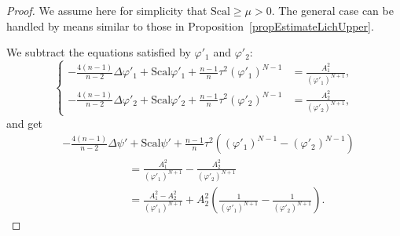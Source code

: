\documentclass[a4paper, 10pt, reqno]{amsart}
\theoremstyle{plain}
\theoremstyle{remark}
\theoremstyle{definition}
\renewcommand{\phi}{\varphi}
\newcommand{\scal}{\mathrm{Scal}}
\begin{document}
\begin{proof}
	We assume here for simplicity that $\scal \geq \mu > 0$. The general case can
	be handled by means similar to those in
	Proposition~\ref{propEstimateLichUpper}.

	We subtract the equations satisfied by $\phi'_1$ and $\phi'_2$:
	\[
		\left\lbrace
		\begin{aligned}
			- \frac{4(n-1)}{n-2} \Delta \phi'_1 + \scal \phi'_1 + \frac{n-1}{n} \tau^2 (\phi'_1)^{N-1} & = \frac{A_1^2}{(\phi'_1)^{N+1}}, \\
			- \frac{4(n-1)}{n-2} \Delta \phi'_2 + \scal \phi'_2 + \frac{n-1}{n} \tau^2 (\phi'_2)^{N-1} & = \frac{A_2^2}{(\phi'_2)^{N+1}},
		\end{aligned}
		\right.
	\]
	and get
	\begin{align*}
		 & - \frac{4(n-1)}{n-2} \Delta \psi' + \scal \psi' + \frac{n-1}{n} \tau^2 \left((\phi'_1)^{N-1} - (\phi'_2)^{N-1}\right)                  \\
		 & \qquad\qquad\qquad = \frac{A_1^2}{(\phi'_1)^{N+1}} - \frac{A_2^2}{(\phi'_2)^{N+1}}                                                     \\
		 & \qquad\qquad\qquad = \frac{A_1^2 - A_2^2}{(\phi'_1)^{N+1}} + A_2^2 \left(\frac{1}{(\phi'_1)^{N+1}} - \frac{1}{(\phi'_2)^{N+1}}\right).
	\end{align*}


\end{proof}
\end{document}
